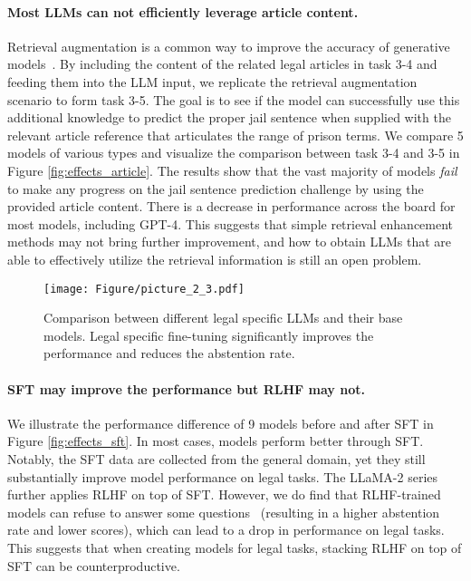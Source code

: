 \paragraph{Most LLMs can not efficiently leverage article content.} 
Retrieval augmentation is a common way to improve the accuracy of generative models~\cite{lewis2020retrieval,jiang2023active,shen2023neural}. By including the content of the related legal articles in task 3-4 and feeding them into the LLM input, we replicate the retrieval augmentation scenario to form task 3-5. The goal is to see if the model can successfully use this additional knowledge to predict the proper jail sentence when supplied with the relevant article reference that articulates the range of prison terms. We compare 5 models of various types and visualize the comparison between task 3-4 and 3-5 in Figure \ref{fig:effects_article}. The results show that the vast majority of models \emph{fail} to make any progress on the jail sentence prediction challenge by using the provided article content. There is a decrease in performance across the board for most models, including GPT-4. This suggests that simple retrieval enhancement methods may not bring further improvement, and how to obtain LLMs that are able to effectively utilize the retrieval information is still an open problem. 

\begin{figure}[t]
    \centering
    \texttt{[image: Figure/picture\_2\_3.pdf]}
    \caption{\small Comparison between different legal specific LLMs and their base models. Legal specific fine-tuning significantly improves the performance and reduces the abstention rate.}
    \label{fig:effects_law_adapt}
\end{figure}

\paragraph{SFT may improve the performance but RLHF may not.}

We illustrate the performance difference of 9 models before and after SFT in Figure \ref{fig:effects_sft}. In most cases, models perform better through SFT. Notably, the SFT data are collected from the general domain, yet they still substantially improve model performance on legal tasks. The LLaMA-2 series further applies RLHF on top of SFT. However, we do find that RLHF-trained models can refuse to answer some questions~\cite{ouyang2022training} (resulting in a higher abstention rate and lower scores), which can lead to a drop in performance on legal tasks. This suggests that when creating models for legal tasks, stacking RLHF on top of SFT can be counterproductive.

